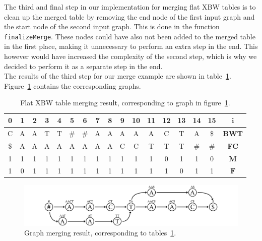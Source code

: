 \documentclass[a4paper,12pt,twoside,BCOR=10mm]{scrbook}
\begin{document}
The third and final step in our implementation for merging flat XBW tables
is to clean up the merged table by removing the end node of the first input graph
and the start node of the second input graph.
This is done in the function \texttt{finalizeMerge}.
These nodes could have also not been added to the merged table in the first place,
making it unnecessary to perform an extra step in the end.
This however would have increased the complexity of the second step, which is why we
decided to perform it as a separate step in the end. \\
The results of the third step for our merge example are shown in
table~\ref{table:evo_fig_flat_merge_step_three}.
Figure~\ref{fig:evo_fig_flat_merge_step_three} contains the corresponding graphs.

\begin{table}[htb]
\centering
\caption[Flat XBW merging result]{Flat XBW table merging result, corresponding to graph in figure~\ref{fig:evo_fig_flat_merge_step_three}.}
{
\renewcommand{\tabcolsep}{5pt}
\begin{tabular}{ | c | c | c | c | c | c | c | c | c | c | c | c | c | c | c | c | c | }
\hline
0 & 1 & 2 & 3 & 4 & 5 & 6 & 7 & 8 & 9 & 10 & 11 & 12 & 13 & 14 & 15 & $\boldsymbol{i}$ \\ \hline
C & A & A & T & T & $\#$ & $\#$ & A & A & A & A & A & C & T & A & \$ & \textbf{BWT} \\ \hline
\$ & A & A & A & A & A & A & A & A & C & C & T & T & T & $\#$ & $\#$ & \textbf{FC} \\ \hline
1 & 1 & 1 & 1 & 1 & 1 & 1 & 1 & 1 & 1 & 1 & 1 & 0 & 1 & 1 & 0 & $\boldsymbol{M}$ \\ \hline
1 & 0 & 1 & 1 & 1 & 1 & 1 & 1 & 1 & 1 & 1 & 1 & 1 & 0 & 1 & 1 & $\boldsymbol{F}$ \\ \hline
\end{tabular}
}
\label{table:evo_fig_flat_merge_step_three}
\end{table}
\begin{figure}[!htb]
\centering
\includegraphics[width=\textwidth]{evo_fig_flat_merge_step_three.pdf}
\caption[Graph merging result]{Graph merging result, corresponding to tables~\ref{table:evo_fig_flat_merge_step_three}.} \label{fig:evo_fig_flat_merge_step_three}
\end{figure}
\end{document}
